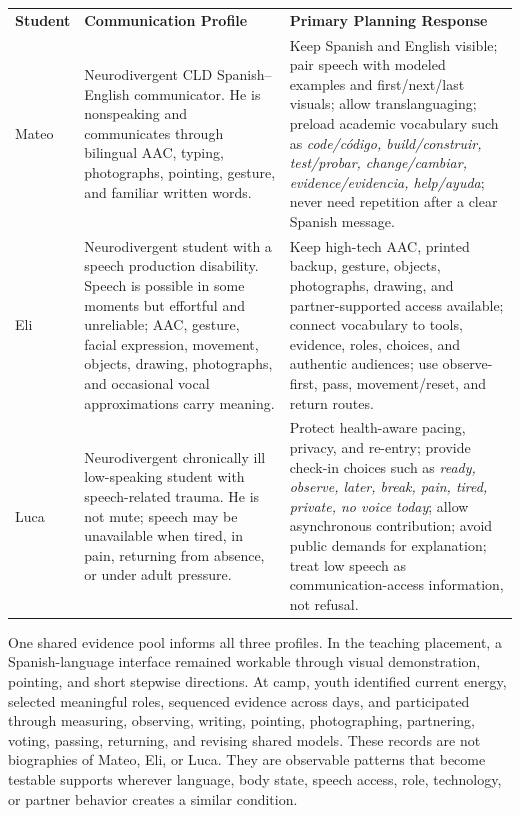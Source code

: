\documentclass[11pt]{article}
\newcommand{\reviewsection}[1]{%
  \Needspace{4\baselineskip}
  \vspace{0.08in}\noindent{\normalsize\bfseries\color{PrimaryRed}#1}
  \par\vspace{0.025in}
}
\newcommand{\tableheaderthree}[3]{%
  \rowcolor{PrimaryRed}
  \color{white}\bfseries #1 &
  \color{white}\bfseries #2 &
  \color{white}\bfseries #3 \\
}
\begin{document}
\reviewsection{Three Student Profiles}
\renewcommand{\arraystretch}{1.0}
\setlength{\tabcolsep}{3pt}
\begin{longtable}{>{\RaggedRight\arraybackslash}p{0.62in} >{\RaggedRight\arraybackslash}p{2.98in} >{\RaggedRight\arraybackslash}p{3.45in}}
\tableheaderthree{Student}{Communication Profile}{Primary Planning Response}

Mateo & Neurodivergent CLD Spanish--English communicator. He is nonspeaking and communicates through bilingual AAC, typing, photographs, pointing, gesture, and familiar written words. & Keep Spanish and English visible; pair speech with modeled examples and first/next/last visuals; allow translanguaging; preload academic vocabulary such as \textit{code/c\'odigo, build/construir, test/probar, change/cambiar, evidence/evidencia, help/ayuda}; never need repetition after a clear Spanish message. \\

\rowcolor{SoftGray}
Eli & Neurodivergent student with a speech production disability. Speech is possible in some moments but effortful and unreliable; AAC, gesture, facial expression, movement, objects, drawing, photographs, and occasional vocal approximations carry meaning. & Keep high-tech AAC, printed backup, gesture, objects, photographs, drawing, and partner-supported access available; connect vocabulary to tools, evidence, roles, choices, and authentic audiences; use observe-first, pass, movement/reset, and return routes. \\

Luca & Neurodivergent chronically ill low-speaking student with speech-related trauma. He is not mute; speech may be unavailable when tired, in pain, returning from absence, or under adult pressure. & Protect health-aware pacing, privacy, and re-entry; provide check-in choices such as \textit{ready, observe, later, break, pain, tired, private, no voice today}; allow asynchronous contribution; avoid public demands for explanation; treat low speech as communication-access information, not refusal. \\

\end{longtable}
\normalsize
One shared evidence pool informs all three profiles. In the teaching placement, a Spanish-language interface remained workable through visual demonstration, pointing, and short stepwise directions. At camp, youth identified current energy, selected meaningful roles, sequenced evidence across days, and participated through measuring, observing, writing, pointing, photographing, partnering, voting, passing, returning, and revising shared models. These records are not biographies of Mateo, Eli, or Luca. They are observable patterns that become testable supports wherever language, body state, speech access, role, technology, or partner behavior creates a similar condition.
\end{document}
